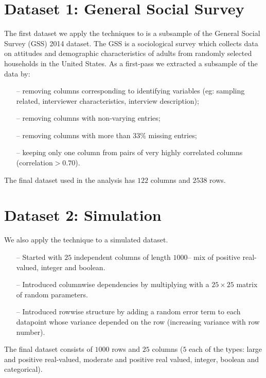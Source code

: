 \documentclass[11pt]{article} %
\begin{document}
\section{Dataset 1: General Social Survey}
The first dataset we apply the techniques to is a subsample of the General Social Survey (GSS) 2014 dataset. The GSS is a sociological survey which collects data on attitudes and demographic characteristics of adults from randomly selected households in the United States. As a first-pass we extracted a subsample of the data by:
\begin{itemize}
\item[--] removing columns corresponding to identifying variables (eg: sampling related, interviewer characteristics, interview description);
\item[--] removing columns with non-varying entries;
\item[--] removing columns with more than $33 \%$ missing entries;
\item[--] keeping only one column from pairs of very highly correlated columns (correlation$>0.70$).
\end{itemize}
The final dataset used in the analysis has $122$ columns and $2538$ rows. 

\section{Dataset 2: Simulation}
We also apply the technique to a simulated dataset.
\begin{itemize}
\item[--] Started with $25$ independent columns of length $1000$-- mix of positive real-valued, integer and boolean.
\item[--] Introduced columnwise dependencies by multiplying with a $25 \times 25$ matrix of random parameters.  
\item[--] Introduced rowwise structure by adding a random error term to each datapoint whose variance depended on the row (increasing variance with row number). 
\end{itemize}
The final dataset consists of $1000$ rows and $25$ columns ($5$ each of the types: large and positive real-valued, moderate and positive real valued, integer, boolean and categorical). 
\end{document}
